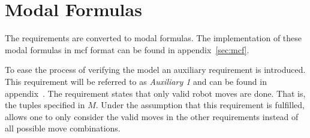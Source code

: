 \section{Modal Formulas}\label{sec:modal_formulas}
The requirements are converted to modal formulas. The implementation of these modal formulas in mcf format can be found in appendix~\ref{sec:mcf}.

To ease the process of verifying the model an auxiliary requirement is introduced.
This requirement will be referred to as \textit{Auxiliary 1} and can be found in appendix~\label{sec:aux1}.
The requirement states that only valid robot moves are done.
That is, the tuples specified in $M$.
Under the assumption that this requirement is fulfilled, allows one to only consider the valid moves in the other requirements instead of all possible move combinations.
